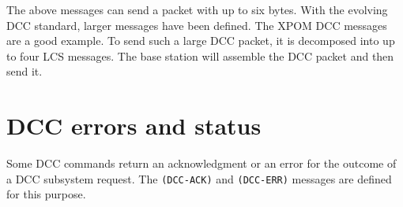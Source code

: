 \begin{table}[ht!]
    \centering 
    \caption{Raw DCC Packet Management}
\end{table}

The above messages can send a packet with up to six bytes. With the evolving DCC standard, larger messages have been defined. The XPOM DCC messages are a good example. To send such a large DCC packet, it is decomposed into up to four LCS messages. The base station will assemble the DCC packet and then send it. 

\begin{table}[ht!]
    \centering 
    \caption{Raw DCC Packet Management}
\end{table}

\section{DCC errors and status}

Some DCC commands return an acknowledgment or an error for the outcome of a DCC subsystem request. The \texttt{(DCC-ACK)} and \texttt{(DCC-ERR)} messages are defined for this purpose.

